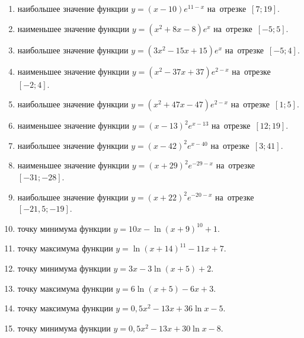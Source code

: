 \documentclass[a4paper,10pt]{article}
\begin{document}
\begin{enumerate}
\item {} наибольшее значение функции $y=\left(x-10\right)e^{11-x}$ на~отрезке~$\left[7;19\right]$.

\item {} наименьшее значение функции $y=\left(x^2 +8x -8\right)e^{x }$ на~отрезке~$\left[-5;5\right]$.

\item {} наибольшее значение функции $y=\left(3x^2 -15x +15\right)e^{x}$ на~отрезке~$\left[-5;4\right]$.

\item {} наименьшее значение функции $y=\left(x^2 -37x +37\right)e^{2-x}$ на~отрезке~$\left[-2;4\right]$.

\item {} наибольшее значение функции $y=\left(x^2 +47x -47\right)e^{2-x}$ на~отрезке~$\left[1;5\right]$.

\item {} наименьшее значение функции $y=\left(x-13\right)^2e^{x-13}$ на~отрезке~$\left[12;19\right]$.

\item {} наибольшее значение функции $y=\left(x-42\right)^2e^{x-40}$ на~отрезке~$\left[3;41\right]$.

\item {} наименьшее значение функции $y=\left(x+29\right)^2e^{-29-x}$ на~отрезке~$\left[-31;-28\right]$.

\item {} наибольшее значение функции $y=\left(x+22\right)^2e^{-20-x}$ на~отрезке~$\left[-21,5;-19\right]$.

\item {} точку минимума функции $y=10x-\ln\left(x+9\right)^{10}+1$.

\item {} точку максимума функции $y=\ln\left(x+14\right)^{11}-11x+7$.

\item {} точку минимума функции $y=3x-3\ln\left(x+5\right)+2$.

\item {} точку максимума функции $y=6\ln\left(x+5\right)-6x+3$.

\item {} точку максимума функции $y=0,5x^2-13x+36\ln x -5$.

\item {} точку минимума функции $y=0,5x^2-13x+30\ln x -8$.


\end{enumerate}
\end{document}
